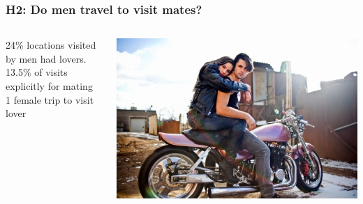 \documentclass{beamer}
\begin{document}
\begin{frame}
\frametitle{H2: Do men travel to visit mates?}

\begin{columns}
\begin{column}{.6\textwidth}
24\% locations visited by men had lovers. \\
\vspace{0.75cm} 
13.5\% of visits explicitly for mating \\
\vspace{0.75cm} 
1 female trip to visit lover \\
\vspace{0.75cm} 
\end{column}

\begin{column}{.4\textwidth}
\includegraphics[width=1\linewidth]{travelmate}
\end{column}

\end{columns}

\end{frame}

\end{document}
